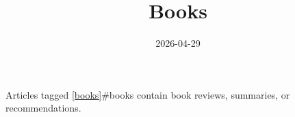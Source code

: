 \documentclass{note}
\title{Books}
\date{2026-04-29}
\begin{document}
Articles tagged \ref{books}{#books} contain book reviews, summaries, or recommendations.
\end{document}
